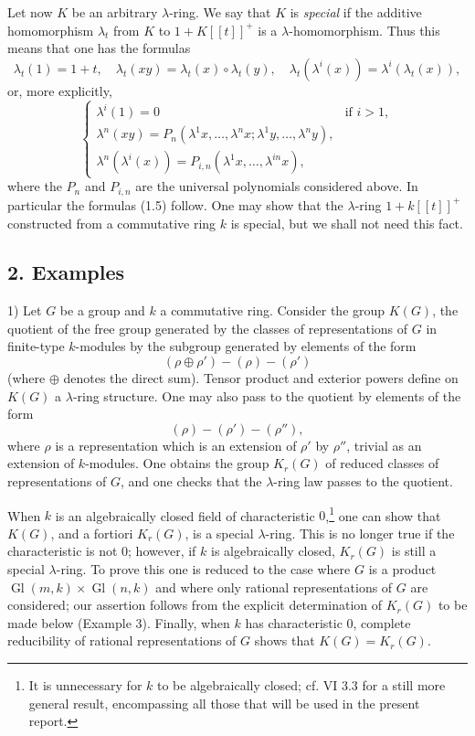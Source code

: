 \documentclass[11pt]{article}
\providecommand{\Gl}{\operatorname{Gl}}
\begin{document}
Let now $K$ be an arbitrary $\lambda$-ring. We say that $K$ is \emph{special} if the additive homomorphism $\lambda_t$ from $K$ to $1+K[[t]]^+$ is a $\lambda$-homomorphism. Thus this means that one has the formulas
\begin{equation}\tag{1.10}
\lambda_t(1)=1+t,\quad
\lambda_t(xy)=\lambda_t(x)\circ\lambda_t(y),\quad
\lambda_t(\lambda^i(x))=\lambda^i(\lambda_t(x)),
\end{equation}
or, more explicitly,
\begin{equation}\tag{1.11}
\begin{cases}
\lambda^i(1)=0 & \text{if }i>1,\\
\lambda^n(xy)=P_n(\lambda^1x,\ldots,\lambda^n x;\lambda^1y,\ldots,\lambda^n y),\\
\lambda^n(\lambda^i(x))=P_{i,n}(\lambda^1x,\ldots,\lambda^{in}x),
\end{cases}
\end{equation}
where the $P_n$ and $P_{i,n}$ are the universal polynomials considered above. In particular the formulas (1.5) follow. One may show that the $\lambda$-ring $1+k[[t]]^+$ constructed from a commutative ring $k$ is special, but we shall not need this fact.

\subsection*{2. Examples}

1) Let $G$ be a group and $k$ a commutative ring. Consider the group $K(G)$, the quotient of the free group generated by the classes of representations of $G$ in finite-type $k$-modules by the subgroup generated by elements of the form
\[
(\rho\oplus\rho')-(\rho)-(\rho')
\]
(where $\oplus$ denotes the direct sum). Tensor product and exterior powers define on $K(G)$ a $\lambda$-ring structure. One may also pass to the quotient by elements of the form
\[
(\rho)-(\rho')-(\rho''),
\]
where $\rho$ is a representation which is an extension of $\rho'$ by $\rho''$, trivial as an extension of $k$-modules. One obtains the group $K_r(G)$ of reduced classes of representations of $G$, and one checks that the $\lambda$-ring law passes to the quotient.

When $k$ is an algebraically closed field of characteristic $0$,\footnote{It is unnecessary for $k$ to be algebraically closed; cf. VI 3.3 for a still more general result, encompassing all those that will be used in the present report.} one can show that $K(G)$, and a fortiori $K_r(G)$, is a special $\lambda$-ring. This is no longer true if the characteristic is not $0$; however, if $k$ is algebraically closed, $K_r(G)$ is still a special $\lambda$-ring. To prove this one is reduced to the case where $G$ is a product $\Gl(m,k)\times\Gl(n,k)$ and where only rational representations of $G$ are considered; our assertion follows from the explicit determination of $K_r(G)$ to be made below (Example 3). Finally, when $k$ has characteristic $0$, complete reducibility of rational representations of $G$ shows that $K(G)=K_r(G)$.
\end{document}
